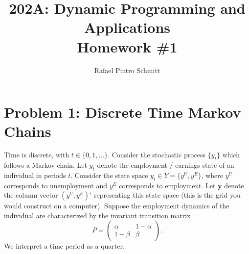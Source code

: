 \documentclass[11pt]{extarticle}
\title{202A: Dynamic Programming and Applications\\[5pt] {\Large \textbf{Homework \#1}}}
\author{Rafael Pintro Schmitt}
\date{}
\theoremstyle{plain}
\theoremstyle{definition}
\begin{document}
\maketitle


\section*{Problem 1: Discrete Time Markov Chains}

Time is discrete, with $t \in \{0, 1, ...\}$. Consider the stochastic process $\{ y_t \}$ which follows a Markov chain. Let $y_t$ denote the employment / earnings state of an individual in periods $t$. Consider the state space $y_t \in Y = \{ y^U, y^E \}$, where $y^U$ corresponds to unemployment and $y^E$ corresponds to employment. Let $\bm y$ denote the column vector $(y^U, y^E)'$ representing this state space (this is the grid you would construct on a computer). Suppose the employment dynamics of the individual are characterized by the invariant transition matrix 
\begin{equation*}
	P = \begin{pmatrix} \alpha & 1 - \alpha \\ 1 - \beta & \beta \end{pmatrix}.
\end{equation*}
We interpret a time period as a quarter. 
\end{document}
